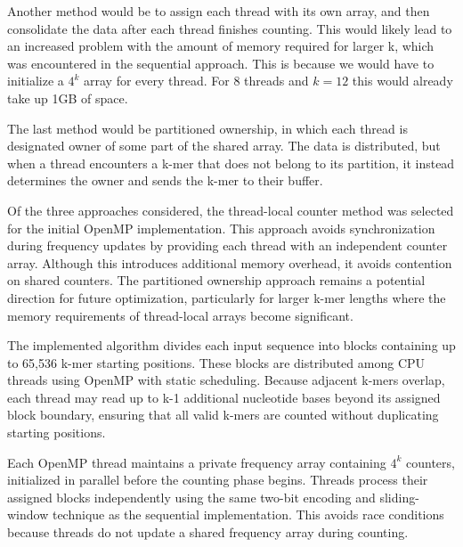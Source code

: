 \documentclass{article}
\begin{document}
\vspace{\baselineskip}

Another method would be to assign each thread with its own array, and then consolidate the data after each thread finishes counting. This would 
likely lead to an increased problem with the amount of memory required for larger k, which was encountered in the sequential approach. This 
is because we would have to initialize a $4^k$ array for every thread. For 8 threads and $k=12$ this would already take up 1GB of space. 

\vspace{\baselineskip}

The last method would be partitioned ownership, in which each thread is designated owner of some part of the shared array. The data is distributed, but 
when a thread encounters a k-mer that does not belong to its partition, it instead determines the owner and sends the k-mer to their buffer. 

\vspace{\baselineskip}

Of the three approaches considered, the thread-local counter method was selected for the initial OpenMP implementation.
This approach avoids synchronization during frequency updates by providing each thread with an independent counter array.
Although this introduces additional memory overhead, it avoids contention on shared counters. The partitioned ownership approach remains a 
potential direction for future optimization, particularly for larger k-mer lengths where the memory requirements of thread-local arrays become significant.

\vspace{\baselineskip}

The implemented algorithm divides each input sequence into blocks containing up to 65,536 k-mer starting positions.
These blocks are distributed among CPU threads using OpenMP with static scheduling. Because adjacent k-mers overlap,
each thread may read up to k-1 additional nucleotide bases beyond its assigned block boundary, ensuring that all
valid k-mers are counted without duplicating starting positions.

\vspace{\baselineskip}

Each OpenMP thread maintains a private frequency array containing $4^k$ counters, initialized in parallel before
the counting phase begins. Threads process their assigned blocks independently using the same two-bit encoding
and sliding-window technique as the sequential implementation. This avoids race conditions because threads do
not update a shared frequency array during counting.
\end{document}
